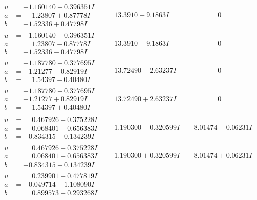 \documentclass[1p]{elsarticle_modified}
\theoremstyle{definition}
\begin{document}
$$\begin{array}{c|c|c}
\begin{aligned}
u &= -1.160140 + 0.396351 I \\
a &= \phantom{-}1.23807 + 0.87778 I \\
b &= -1.52336 + 0.47798 I\end{aligned}
 & \phantom{-}13.3910 - 9.1863 I & \phantom{-0.000000 } 0 \\ \hline\begin{aligned}
u &= -1.160140 - 0.396351 I \\
a &= \phantom{-}1.23807 - 0.87778 I \\
b &= -1.52336 - 0.47798 I\end{aligned}
 & \phantom{-}13.3910 + 9.1863 I & \phantom{-0.000000 } 0 \\ \hline\begin{aligned}
u &= -1.187780 + 0.377695 I \\
a &= -1.21277 - 0.82919 I \\
b &= \phantom{-}1.54397 - 0.40480 I\end{aligned}
 & \phantom{-}13.72490 - 2.63237 I & \phantom{-0.000000 } 0 \\ \hline\begin{aligned}
u &= -1.187780 - 0.377695 I \\
a &= -1.21277 + 0.82919 I \\
b &= \phantom{-}1.54397 + 0.40480 I\end{aligned}
 & \phantom{-}13.72490 + 2.63237 I & \phantom{-0.000000 } 0 \\ \hline\begin{aligned}
u &= \phantom{-}0.467926 + 0.375228 I \\
a &= \phantom{-}0.068401 - 0.656383 I \\
b &= -0.834315 + 0.134239 I\end{aligned}
 & \phantom{-}1.190300 - 0.320599 I & \phantom{-}8.01474 - 0.06231 I \\ \hline\begin{aligned}
u &= \phantom{-}0.467926 - 0.375228 I \\
a &= \phantom{-}0.068401 + 0.656383 I \\
b &= -0.834315 - 0.134239 I\end{aligned}
 & \phantom{-}1.190300 + 0.320599 I & \phantom{-}8.01474 + 0.06231 I \\ \hline\begin{aligned}
u &= \phantom{-}0.239901 + 0.477819 I \\
a &= -0.049714 + 1.108090 I \\
b &= \phantom{-}0.899573 + 0.293268 I\end{aligned}

\end{array}$$
\end{document}
